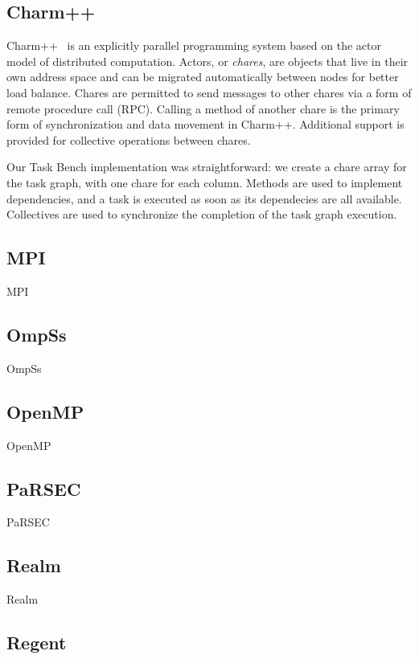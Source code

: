 \subsection{Charm++}

Charm++~\cite{Charmpp93} is an explicitly parallel programming system
based on the actor model of distributed computation. Actors, or
\emph{chares}, are objects that live in their own address space and
can be migrated automatically between nodes for better load
balance. Chares are permitted to send messages to other chares via a
form of remote procedure call (RPC). Calling a method of another chare
is the primary form of synchronization and data movement in
Charm++. Additional support is provided for collective operations
between chares.

Our Task Bench implementation was straightforward: we create a chare
array for the task graph, with one chare for each column. Methods are
used to implement dependencies, and a task is executed as soon as its
dependecies are all available. Collectives are used to synchronize the
completion of the task graph execution.

\subsection{MPI}

MPI~\cite{MPI}

\subsection{OmpSs}

OmpSs~\cite{OmpSs11}

\subsection{OpenMP}

OpenMP~\cite{OpenMPSpec40}

\subsection{PaRSEC}

PaRSEC~\cite{PARSEC13}

\subsection{Realm}

Realm~\cite{Realm14}

\subsection{Regent}

